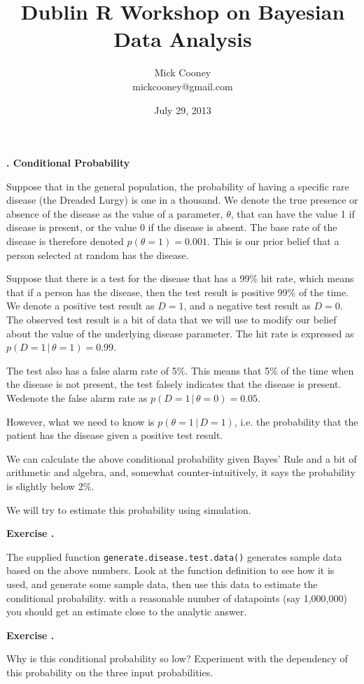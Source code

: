 \documentclass[10pt, a4paper]{article}
\title{Dublin R Workshop on Bayesian Data Analysis}
\author{Mick Cooney\\mickcooney@gmail.com}
\date{July 29, 2013}
\newcounter{wssection}
\newcounter{wsexercise}[wssection]
\newcommand{\worksheetsection}[1]{
\vspace{10mm}
\stepcounter{wssection}
\noindent \Large \textbf{\thewssection. #1} \normalsize
\vspace{3mm}
}
\newcommand{\worksheetexercise}{
\stepcounter{wsexercise}
\vspace{5mm} \noindent \textbf{Exercise \thewssection.\thewsexercise \;}
}
\begin{document}
\maketitle


\worksheetsection{Conditional Probability}

\noindent
Suppose that in the general population, the probability of having a
specific rare disease (the Dreaded Lurgy) is one in a thousand. We
denote the true presence or absence of the disease as the value of a
parameter, $\theta$, that can have the value 1 if disease is present,
or the value 0 if the disease is absent. The base rate of the disease
is therefore denoted $p(\theta = 1) = 0.001$. This is our prior belief
that a person selected at random has the disease.

Suppose that there is a test for the disease that has a 99\% hit rate,
which means that if a person has the disease, then the test result is
positive 99\% of the time. We denote a positive test result as $D = 1$,
and a negative test result as $D = 0$. The observed test result is
a bit of data that we will use to modify our belief about the value of
the underlying disease parameter. The hit rate is expressed as
$p(D = 1 \, | \, \theta = 1) = 0.99$.

The test also has a false alarm rate of 5\%. This means that 5\% of
the time when the disease is not present, the test falsely indicates
that the disease is present. Wedenote the false alarm rate as
$p(D = 1 \, | \, \theta = 0) = 0.05$.

However, what we need to know is $p(\theta = 1 \, | \, D = 1)$, i.e. the
probability that the patient has the disease given a positive test
result.

We can calculate the above conditional probability given Bayes' Rule
and a bit of arithmetic and algebra, and, somewhat
counter-intuitively, it says the probability is slightly below 2\%.

We will try to estimate this probability using simulation.

\worksheetexercise
The supplied function \texttt{generate.disease.test.data()} generates
sample data based on the above numbers. Look at the function
definition to see how it is used, and generate some sample data, then
use this data to estimate the conditional probability. with a
reasonable number of datapoints (say 1,000,000) you should get an
estimate close to the analytic answer.


\worksheetexercise
Why is this conditional probability so low? Experiment with the
dependency of this probability on the three input probabilities.
\end{document}
